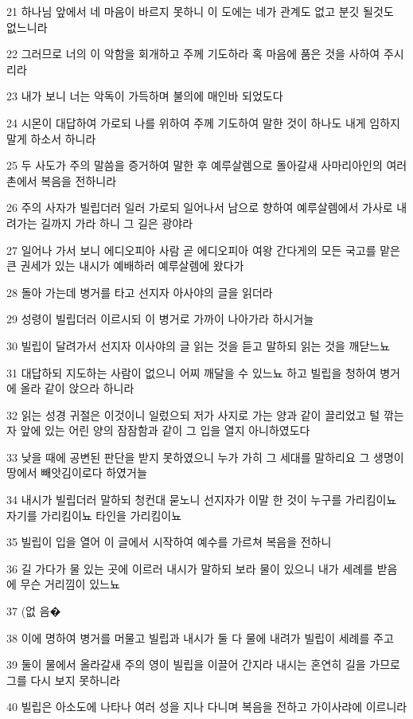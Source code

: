 \par 21 하나님 앞에서 네 마음이 바르지 못하니 이 도에는 네가 관계도 없고 분깃 될것도 없느니라
\par 22 그러므로 너의 이 악함을 회개하고 주께 기도하라 혹 마음에 품은 것을 사하여 주시리라
\par 23 내가 보니 너는 악독이 가득하며 불의에 매인바 되었도다
\par 24 시몬이 대답하여 가로되 나를 위하여 주께 기도하여 말한 것이 하나도 내게 임하지 말게 하소서 하니라
\par 25 두 사도가 주의 말씀을 증거하여 말한 후 예루살렘으로 돌아갈새 사마리아인의 여러 촌에서 복음을 전하니라
\par 26 주의 사자가 빌립더러 일러 가로되 일어나서 남으로 향하여 예루살렘에서 가사로 내려가는 길까지 가라 하니 그 길은 광야라
\par 27 일어나 가서 보니 에디오피아 사람 곧 에디오피아 여왕 간다게의 모든 국고를 맡은 큰 권세가 있는 내시가 예배하러 예루살렘에 왔다가
\par 28 돌아 가는데 병거를 타고 선지자 아사야의 글을 읽더라
\par 29 성령이 빌립더러 이르시되 이 병거로 가까이 나아가라 하시거늘
\par 30 빌립이 달려가서 선지자 이사야의 글 읽는 것을 듣고 말하되 읽는 것을 깨닫느뇨
\par 31 대답하되 지도하는 사람이 없으니 어찌 깨달을 수 있느뇨 하고 빌립을 청하여 병거에 올라 같이 앉으라 하니라
\par 32 읽는 성경 귀절은 이것이니 일렀으되 저가 사지로 가는 양과 같이 끌리었고 털 깎는 자 앞에 있는 어린 양의 잠잠함과 같이 그 입을 열지 아니하였도다
\par 33 낮을 때에 공변된 판단을 받지 못하였으니 누가 가히 그 세대를 말하리요 그 생명이 땅에서 빼앗김이로다 하였거늘
\par 34 내시가 빌립더러 말하되 청컨대 묻노니 선지자가 이말 한 것이 누구를 가리킴이뇨 자기를 가리킴이뇨 타인을 가리킴이뇨
\par 35 빌립이 입을 열어 이 글에서 시작하여 예수를 가르쳐 복음을 전하니
\par 36 길 가다가 물 있는 곳에 이르러 내시가 말하되 보라 물이 있으니 내가 세례를 받음에 무슨 거리낌이 있느뇨
\par 37 (없 음�
\par 38 이에 명하여 병거를 머물고 빌립과 내시가 둘 다 물에 내려가 빌립이 세례를 주고
\par 39 둘이 물에서 올라갈새 주의 영이 빌립을 이끌어 간지라 내시는 혼연히 길을 가므로 그를 다시 보지 못하니라
\par 40 빌립은 아소도에 나타나 여러 성을 지나 다니며 복음을 전하고 가이사랴에 이르니라

